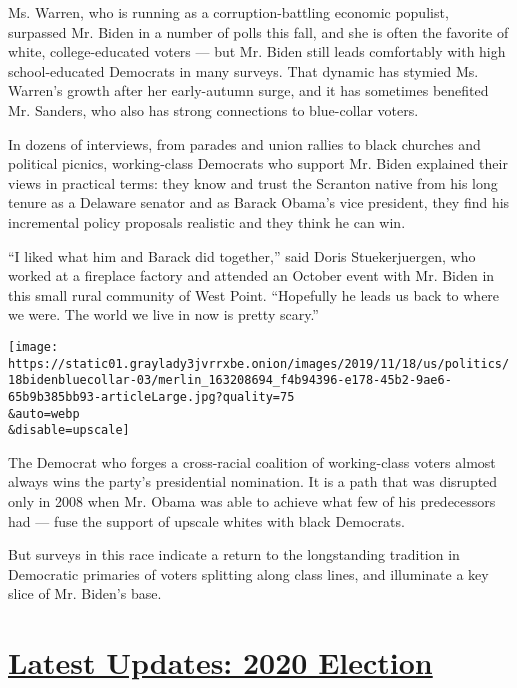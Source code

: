 Ms. Warren, who is running as a corruption-battling economic populist,
surpassed Mr. Biden in a number of polls this fall, and she is often the
favorite of white, college-educated voters --- but Mr. Biden still leads
comfortably with high school-educated Democrats in many surveys. That
dynamic has stymied Ms. Warren's growth after her early-autumn surge,
and it has sometimes benefited Mr. Sanders, who also has strong
connections to blue-collar voters.

In dozens of interviews, from parades and union rallies to black
churches and political picnics, working-class Democrats who support Mr.
Biden explained their views in practical terms: they know and trust the
Scranton native from his long tenure as a Delaware senator and as Barack
Obama's vice president, they find his incremental policy proposals
realistic and they think he can win.

``I liked what him and Barack did together,'' said Doris Stuekerjuergen,
who worked at a fireplace factory and attended an October event with Mr.
Biden in this small rural community of West Point. ``Hopefully he leads
us back to where we were. The world we live in now is pretty scary.''

\texttt{[image: https://static01.graylady3jvrrxbe.onion/images/2019/11/18/us/politics/18bidenbluecollar-03/merlin\_163208694\_f4b94396-e178-45b2-9ae6-65b9b385bb93-articleLarge.jpg?quality=75\\\&auto=webp\\\&disable=upscale]}

The Democrat who forges a cross-racial coalition of working-class voters
almost always wins the party's presidential nomination. It is a path
that was disrupted only in 2008 when Mr. Obama was able to achieve what
few of his predecessors had --- fuse the support of upscale whites with
black Democrats.

But surveys in this race indicate a return to the longstanding tradition
in Democratic primaries of voters splitting along class lines, and
illuminate a key slice of Mr. Biden's base.

\hypertarget{latest-updates-2020-election}{%
\section{\texorpdfstring{\href{https://www.nytimes3xbfgragh.onion/live/2020/08/19/us/dnc-convention-election?action=click\&pgtype=Article\&state=default\&region=MAIN_CONTENT_1\&context=storylines_live_updates}{Latest
Updates: 2020
Election}}{Latest Updates: 2020 Election}}\label{latest-updates-2020-election}}

